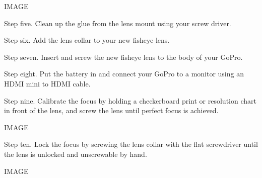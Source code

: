 \begin{fullwidth}
IMAGE

Step five. Clean up the glue from the lens mount using your screw driver.

Step six. Add the lens collar to your new fisheye lens.

Step seven. Insert and screw the new fisheye lens to the body of your GoPro.

Step eight. Put the battery in and connect your GoPro to a monitor using an HDMI mini to HDMI cable.

Step nine. Calibrate the focus by holding a checkerboard print or resolution chart in front of the lens, and screw the lens until perfect focus is achieved. 

IMAGE

Step ten. Lock the focus by screwing the lens collar with the flat screwdriver until the lens is unlocked and unscrewable by hand.

IMAGE


\clearpage
\end{fullwidth}

